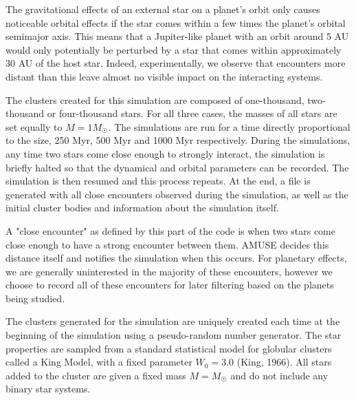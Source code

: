 \documentclass[12pt]{article}
\begin{document}
    The gravitational effects of an external star on a planet's orbit only
    causes noticeable orbital effects if the star comes within a few times the
    planet's orbital semimajor axis. This means that a Jupiter-like planet with an orbit around
    5 AU would only potentially be perturbed by a star that comes within 
    approximately 30 AU of the host star. Indeed, experimentally, we observe that
    encounters more distant than this leave almost no visible impact on the
    interacting systems. 

    The clusters created for this simulation are composed of one-thousand, two-thousand
    or four-thousand stars. For all three cases, the masses of all stars are set equally
    to $M = 1 M_{\astrosun}$. The simulations are run for a time directly proportional
    to the size, 250 Myr, 500 Myr and 1000 Myr respectively.  During the simulations, 
    any time two stars
    come close enough to strongly interact, the simulation is briefly halted so that
    the dynamical and orbital parameters can be recorded. The simulation is then
    resumed and this process repeats. At the end, a file is generated with
    all close encounters observed during the simulation, as well as the initial
    cluster bodies and information about the simulation itself.

    A "close encounter" as defined by this part of the code is when two stars
    come close enough to have a strong encounter between them. AMUSE decides
    this distance itself and notifies the simulation when this occurs. For planetary
    effects, we are generally uninterested in the majority of these encounters, however
    we choose to record all of these encounters for later filtering based on the
    planets being studied.

    The clusters generated for the simulation are uniquely created each time at the
    beginning of the simulation using a pseudo-random number generator. 
    The star properties are sampled from a standard statistical model for globular
    clusters called a
    King Model, with a fixed parameter $W_0=3.0$ (King, 1966).
    All stars added to the cluster are given a fixed mass $M=M_{\astrosun}$ and do not
    include any binary star systems.     
\end{document}
